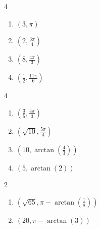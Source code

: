 \documentclass{ximera}
\begin{document}
\begin{multicols}{4}

\begin{enumerate}

\setcounter{enumi}{\value{HW}}

\item $\left( 3, \pi \right)$ 
\item $\left( 2, \frac{3\pi}{4} \right)$
\item $\left( 8, \frac{4\pi}{3} \right)$
\item $\left( \frac{1}{2}, \frac{11\pi}{6} \right)$

\setcounter{HW}{\value{enumi}}

\end{enumerate}

\end{multicols}

\begin{multicols}{4}

\begin{enumerate}

\setcounter{enumi}{\value{HW}}

\item $\left( \frac{3}{5}, \frac{4\pi}{3} \right)$
\item $\left( \sqrt{10}, \frac{5\pi}{4} \right)$
\item  $\left( 10, \arctan\left(\frac{4}{3}\right) \right)$
\item  $\left( 5, \arctan\left(2\right) \right)$ 

\setcounter{HW}{\value{enumi}}

\end{enumerate}

\end{multicols}

\begin{multicols}{2}

\begin{enumerate}

\setcounter{enumi}{\value{HW}}

\item $\left( \sqrt{65}, \pi - \arctan\left(\frac{1}{8}\right)\right)$
\item  $(20, \pi - \arctan(3))$ 

\setcounter{HW}{\value{enumi}}

\end{enumerate}

\end{multicols}
\end{document}
